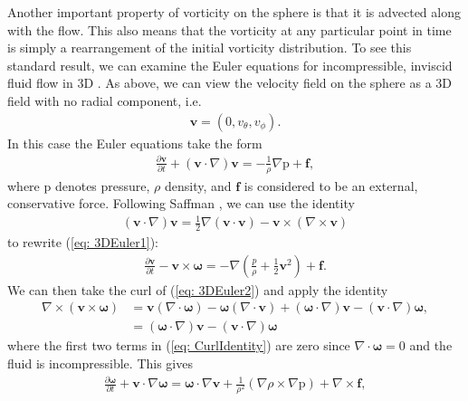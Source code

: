 \documentclass{sfuthesis}
\begin{document}
Another important property of vorticity on the sphere is that it is advected along with the flow. This also means that the vorticity at any particular point in time is simply a rearrangement of the initial vorticity distribution. To see this standard result, we can examine the Euler equations for incompressible, inviscid fluid flow in 3D \cite{Newt2001, Saff92}. As above, we can view the velocity field on the sphere as a 3D field with no radial component, i.e.
\begin{align*}
	\mathbf{v}=(0, v_{\theta}, v_{\phi}).
\end{align*}
In this case the Euler equations take the form
\begin{align}
	\frac{\partial \mathbf{v}}{\partial t} + \left(\mathbf{v}\cdot \nabla\right)\mathbf{v} = -\frac{1}{\rho} \nabla \text{p} + \mathbf{f}, \label{eq: 3DEuler1} 
\end{align}
where p denotes pressure, $\rho$ density, and $\mathbf{f}$ is considered to be an external, conservative force. 
Following Saffman \cite{Saff92}, we can use the identity
\begin{align*}
	\left(\mathbf{v}\cdot \nabla \right)\mathbf{v} = \frac{1}{2} \nabla(\mathbf{v}\cdot \mathbf{v}) - \mathbf{v} \times (\nabla \times \mathbf{v})
\end{align*}
to rewrite (\ref{eq: 3DEuler1}): 
\begin{align}
	\frac{\partial \mathbf{v}}{\partial t}- \mathbf{v} \times \bm{\omega} = -\nabla \left(\frac{p}{\rho} + \frac{1}{2} \mathbf{v}^2 \right) + \mathbf{f}. \label{eq: 3DEuler2}
\end{align}
We can then take the curl of (\ref{eq: 3DEuler2}) and apply the identity
\begin{align}
	\nabla \times (\mathbf{v} \times \bm{\omega})&= \mathbf{v}(\nabla \cdot \bm{\omega}) - \bm{\omega}(\nabla \cdot \mathbf{v})+(\bm{\omega} \cdot \nabla)\mathbf{v}- (\mathbf{v} \cdot \nabla)\bm{\omega}, \label{eq: CurlIdentity} \\
	&=(\bm{\omega} \cdot \nabla)\mathbf{v}- (\mathbf{v} \cdot \nabla)\bm{\omega} \nonumber
\end{align}
where the first two terms in (\ref{eq: CurlIdentity}) are zero since $\nabla \cdot \bm{\omega}=0$ and the fluid is incompressible. 
This gives
\begin{align*}
	\frac{\partial \bm{\omega}}{\partial t} + \mathbf{v} \cdot \nabla \bm{\omega} = \bm{\omega} \cdot \nabla \mathbf{v} + \frac{1}{\rho^2}\left(\nabla \rho \times \nabla \text{p}\right) + \nabla \times \mathbf{f},
\end{align*}
\end{document}
